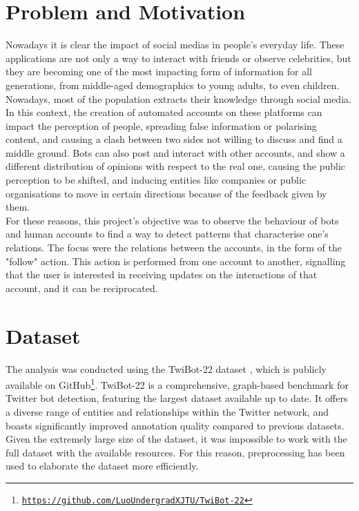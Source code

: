 \documentclass[12pt, a4paper]{article}
\begin{document}
\section{Problem and Motivation} \label{problem-and-motivation}
    Nowadays it is clear the impact of social medias in people's everyday life. These applications are not only a way to interact with friends or observe celebrities, but they are becoming one of the most impacting form of information for all generations, from middle-aged demographics to young adults, to even children.\\
    Nowadays, most of the population extracts their knowledge through social media. In this context, the creation of automated accounts on these platforms can impact the perception of people, spreading false information or polarising content, and causing a clash between two sides not willing to discuss and find a middle ground. Bots can also post and interact with other accounts, and show a different distribution of opinions with respect to the real one, causing the public perception to be shifted, and inducing entities like companies or public organisations to move in certain directions because of the feedback given by them.\\
    For these reasons, this project's objective was to observe the behaviour of bots and human accounts to find a way to detect patterns that characterise one's relations. The focus were the relations between the accounts, in the form of the "follow" action. This action is performed from one account to another, signalling that the user is interested in receiving updates on the interactions of that account, and it can be reciprocated.


\section{Dataset} \label{dataset}
	The analysis was conducted using the TwiBot-22 dataset \cite{twibot22}, which is publicly available on GitHub\footnote{\href{https://github.com/LuoUndergradXJTU/TwiBot-22}{\texttt{https://github.com/LuoUndergradXJTU/TwiBot-22}}}. TwiBot-22 is a comprehensive, graph-based benchmark for Twitter bot detection, featuring the largest dataset available up to date. It offers a diverse range of entities and relationships within the Twitter network, and boasts significantly improved annotation quality compared to previous datasets.\\
	Given the extremely large size of the dataset, it was impossible to work with the full dataset with the available resources. For this reason, preprocessing has been used to elaborate the dataset more efficiently.
\end{document}

